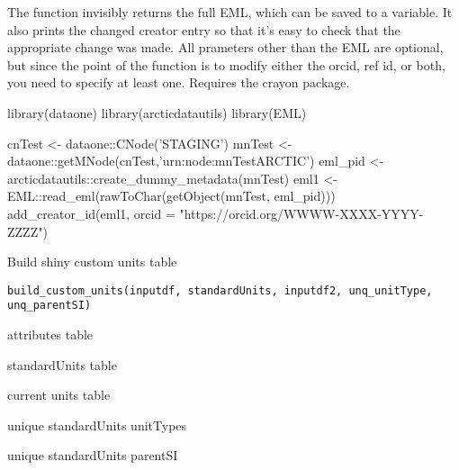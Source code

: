 \documentclass[letterpaper]{book}
\begin{document}
%
\begin{Details}\relax
The function invisibly returns the full EML, which
can be saved to a variable. It also prints the changed creator
entry so that it's easy to check that the appropriate change was
made. All prameters other than the EML are optional, but since
the point of the function is to modify either the orcid, ref id,
or both, you need to specify at least one. Requires the
crayon package.
\end{Details}
%
\begin{Examples}
\begin{ExampleCode}
library(dataone)
library(arcticdatautils)
library(EML)

cnTest <- dataone::CNode('STAGING')
mnTest <- dataone::getMNode(cnTest,'urn:node:mnTestARCTIC')
eml_pid <- arcticdatautils::create_dummy_metadata(mnTest)
eml1 <- EML::read_eml(rawToChar(getObject(mnTest, eml_pid)))
add_creator_id(eml1, orcid = "https://orcid.org/WWWW-XXXX-YYYY-ZZZZ")
\end{ExampleCode}
\end{Examples}
%
\begin{Description}\relax
Build shiny custom units table
\end{Description}
%
\begin{Usage}
\begin{verbatim}
build_custom_units(inputdf, standardUnits, inputdf2, unq_unitType, unq_parentSI)
\end{verbatim}
\end{Usage}
%
\begin{Arguments}
\begin{ldescription}
\item[\code{inputdf}] attributes table

\item[\code{standardUnits}] standardUnits table

\item[\code{inputdf2}] current units table

\item[\code{unq\_unitType}] unique standardUnits unitTypes

\item[\code{unq\_parentSI}] unique standardUnits parentSI
\end{ldescription}
\end{Arguments}
\end{document}
